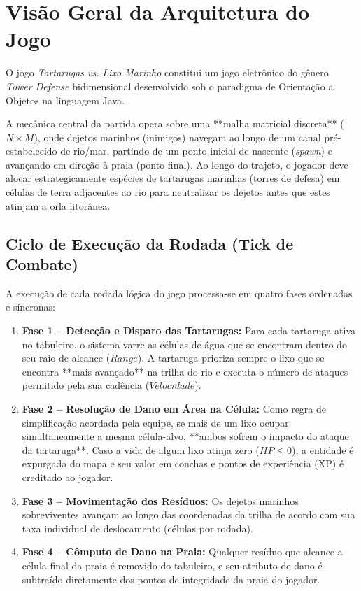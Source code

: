 \documentclass[11pt,a4paper]{article}
\begin{document}
\newpage
\tableofcontents
\newpage

\section{Visão Geral da Arquitetura do Jogo}

O jogo \textit{Tartarugas vs. Lixo Marinho} constitui um jogo eletrônico do gênero \textit{Tower Defense} bidimensional desenvolvido sob o paradigma de Orientação a Objetos na linguagem Java. 

A mecânica central da partida opera sobre uma **malha matricial discreta** ($N \times M$), onde dejetos marinhos (inimigos) navegam ao longo de um canal pré-estabelecido de rio/mar, partindo de um ponto inicial de nascente (\textit{spawn}) e avançando em direção à praia (ponto final). Ao longo do trajeto, o jogador deve alocar estrategicamente espécies de tartarugas marinhas (torres de defesa) em células de terra adjacentes ao rio para neutralizar os dejetos antes que estes atinjam a orla litorânea.

\subsection{Ciclo de Execução da Rodada (Tick de Combate)}
A execução de cada rodada lógica do jogo processa-se em quatro fases ordenadas e síncronas:

\begin{enumerate}[leftmargin=*]
  \item \textbf{Fase 1 -- Detecção e Disparo das Tartarugas:} Para cada tartaruga ativa no tabuleiro, o sistema varre as células de água que se encontram dentro do seu raio de alcance ($Range$). A tartaruga prioriza sempre o lixo que se encontra **mais avançado** na trilha do rio e executa o número de ataques permitido pela sua cadência ($Velocidade$).
  \item \textbf{Fase 2 -- Resolução de Dano em Área na Célula:} Como regra de simplificação acordada pela equipe, se mais de um lixo ocupar simultaneamente a mesma célula-alvo, **ambos sofrem o impacto do ataque da tartaruga**. Caso a vida de algum lixo atinja zero ($HP \le 0$), a entidade é expurgada do mapa e seu valor em conchas e pontos de experiência (XP) é creditado ao jogador.
  \item \textbf{Fase 3 -- Movimentação dos Resíduos:} Os dejetos marinhos sobreviventes avançam ao longo das coordenadas da trilha de acordo com sua taxa individual de deslocamento (células por rodada).
  \item \textbf{Fase 4 -- Cômputo de Dano na Praia:} Qualquer resíduo que alcance a célula final da praia é removido do tabuleiro, e seu atributo de dano é subtraído diretamente dos pontos de integridade da praia do jogador.
\end{enumerate}
\end{document}
